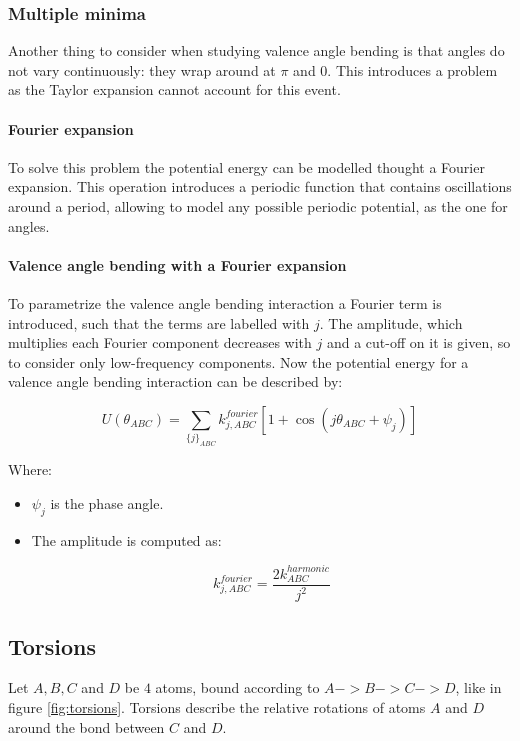 		\subsubsection{Multiple minima}
		Another thing to consider when studying valence angle bending is that angles do not vary continuously: they wrap around at $\pi$ and $0$.
		This introduces a problem as the Taylor expansion cannot account for this event.

			\paragraph{Fourier expansion}
			To solve this problem the potential energy can be modelled thought a Fourier expansion.
			This operation introduces a periodic function that contains oscillations around a period, allowing to model any possible periodic potential, as the one for angles.

			\paragraph{Valence angle bending with a Fourier expansion}
			To parametrize the valence angle bending interaction a Fourier term is introduced, such that the terms are labelled with $j$.
			The amplitude, which multiplies each Fourier component decreases with $j$ and a cut-off on it is given, so to consider only low-frequency components.
			Now the potential energy for a valence angle bending interaction can be described by:

			$$U(\theta_{ABC}) = \sum\limits_{\{j\}_{ABC}}k^{fourier}_{j,ABC}[1+\cos(j\theta_{ABC}+\psi_j)]$$

			Where:

			\begin{multicols}{2}
			  \begin{itemize}
			    \item $\psi_j$ is the phase angle.
					\item The amplitude is computed as:

						$$k_{j, ABC}^{fourier} = \frac{2k^{harmonic}_{ABC}}{j^2}$$

			  \end{itemize}
			\end{multicols}

	\subsection{Torsions}
	Let $A, B, C$ and $D$ be $4$ atoms, bound according to $A->B->C->D$, like in figure \ref{fig:torsions}.
	Torsions describe the relative rotations of atoms $A$ and $D$ around the bond between $C$ and $D$.

